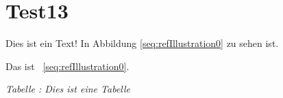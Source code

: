 \chapter{Test13}

Dies ist ein Text! In Abbildung \ref{seq:refIllustration0} zu sehen ist.


Das ist \figurename~\ref{seq:refIllustration0}.

{\itshape
Tabelle : Dies ist eine Tabelle}

\endinput

